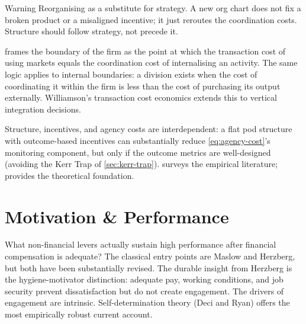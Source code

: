 \begin{admonition}{Warning}
Reorganising as a substitute for strategy. A new org chart does not fix a broken product or a misaligned incentive; it just reroutes the coordination costs. Structure should follow strategy, not precede it.
\end{admonition}

\textcite{coase1937nature} frames the boundary of the firm as the point at which the transaction cost of using markets equals the coordination cost of internalising an activity. The same logic applies to internal boundaries: a division exists when the cost of coordinating it within the firm is less than the cost of purchasing its output externally. Williamson's transaction cost economics extends this to vertical integration decisions.

Structure, incentives, and agency costs are interdependent: a flat pod structure with outcome-based incentives can substantially reduce \cref{eq:agency-cost}'s monitoring component, but only if the outcome metrics are well-designed (avoiding the Kerr Trap of \cref{sec:kerr-trap}). \textcite{robbins2022} surveys the empirical literature; \textcite{coase1937nature} provides the theoretical foundation.

\section{Motivation \& Performance}\label{sec:motivation}

What non-financial levers actually sustain high performance after financial compensation is adequate? The classical entry points are Maslow and Herzberg, but both have been substantially revised. The durable insight from Herzberg is the hygiene-motivator distinction: adequate pay, working conditions, and job security prevent dissatisfaction but do not create engagement. The drivers of engagement are intrinsic. Self-determination theory (Deci and Ryan) offers the most empirically robust current account.

